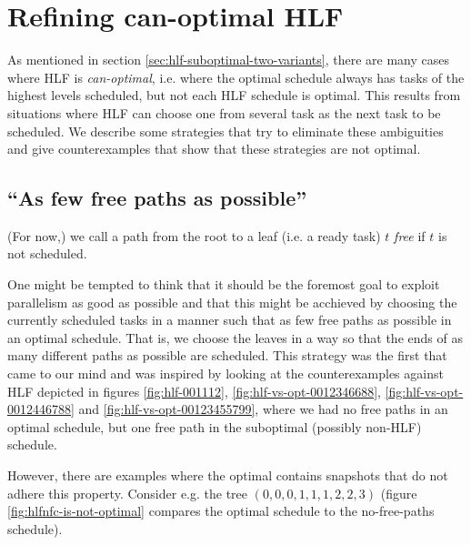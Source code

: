 \section{Refining can-optimal HLF}
\label{sec:suboptimal-hlf-can-optimal-strategies}

As mentioned in section \ref{sec:hlf-suboptimal-two-variants}, there are many cases where HLF is \emph{can-optimal}, i.e. where the optimal schedule always has tasks of the highest levels scheduled, but not each HLF schedule is optimal. This results from situations where HLF can choose one from several task as the next task to be scheduled. We describe some strategies that try to eliminate these ambiguities and give counterexamples that show that these strategies are not optimal.

\subsection{``As few free paths as possible''}
\label{sec:disproving-hlf-no-free-chain}

(For now,) we call a path from the root to a leaf (i.e. a ready task) $t$ \emph{free} if $t$ is not scheduled.

One might be tempted to think that it should be the foremost goal to exploit parallelism as good as possible and that this might be acchieved by choosing the currently scheduled tasks in a manner such that as few free paths as possible in an optimal schedule. That is, we choose the leaves in a way so that the ends of as many different paths as possible are scheduled. This strategy was the first that came to our mind and was inspired by looking at the counterexamples against HLF depicted in figures \ref{fig:hlf-001112}, \ref{fig:hlf-vs-opt-0012346688}, \ref{fig:hlf-vs-opt-0012446788} and \ref{fig:hlf-vs-opt-00123455799}, where we had no free paths in an optimal schedule, but one free path in the suboptimal (possibly non-HLF) schedule. %

However, there are examples where the optimal contains snapshots that do not adhere this property. Consider e.g. the tree $(0,0,0,1,1,1,2,2,3)$ (figure \ref{fig:hlfnfc-is-not-optimal} compares the optimal schedule to the no-free-paths schedule).

